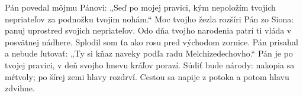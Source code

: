 Pán povedal môjmu Pánovi: „Seď po mojej pravici,
\versseparator
kým nepoložím tvojich nepriateľov za podnožku tvojim nohám.“
\versseparator
Moc tvojho žezla rozšíri Pán zo Siona:
panuj uprostred svojich nepriateľov.
\versseparator
Odo dňa tvojho narodenia patrí ti vláda
v posvätnej nádhere.
Splodil som ťa ako rosu pred východom zornice.
\versseparator
Pán prisahal a nebude ľutovať:
„Ty si kňaz naveky podľa radu Melchizedechovho.“
\versseparator
Pán je po tvojej pravici,
v deň svojho hnevu kráľov porazí.
\versseparator
Súdiť bude národy: nakopia sa mŕtvoly;
po šírej zemi hlavy rozdrví.
\versseparator
Cestou sa napije z potoka
a potom hlavu zdvihne.